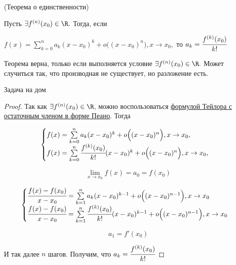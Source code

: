 \begin{theorem}
	\hypertarget{thrm7.3}{(Теорема о единственности)} Пусть $\exists f^{(n)}(x_{0}) \in \R.$ Тогда, если 
	
	$f(x) = \sum\limits_{k =0}^{n} a_{k}(x-x_{0})^{k} + o\Big((x-x_{0})^{n}\Big), x \to x_{0},$ то $a_{k} = \cfrac{f^{(k)}(x_{0})}{k!}$
\end{theorem}
\begin{note}
	Теорема верна, только если выполняется условие $\exists f^{(n)}(x_{0}) \in \R.$ Может случиться так, что производная не существует, но разложение есть.
\begin{example}
	Задача на дом
\end{example} 
\end{note}
\begin{proof}
	Так как $\exists f^{(n)}(x_{0}) \in \R$, можно воспользоваться \hyperlink{thrm7.1}{формулой Тейлора с остаточным членом в форме Пеано}. Тогда 
	
	$$\begin{cases}
		f(x) = \sum\limits_{k = 0}^{n} a_{k} (x-x_{0})^{k} +  o\Big((x-x_{0})^{n}\Big) , x \to x_{0}, \\
		f(x) = \sum\limits_{k = 0}^{n} \cfrac{f^{(k)}(x_{0})}{k!} (x-x_{0})^{k} +  o\Big((x-x_{0})^{n}\Big) , x \to x_{0},
	\end{cases}$$
	
	$$ \lim\limits_{x\to x_{0}} f(x) =  a_{0} = f(x_{0})$$
	
	$$
	\begin{cases}
		\cfrac{f(x)-f(x_{0})}{x-x_{0}} = \sum\limits_{k=1}^{n} a_{k} (x-x_{0})^{k-1} +o\Big((x-x_{0})^{n-1}\Big) , x \to x_{0} \\
		\cfrac{f(x)-f(x_{0})}{x-x_{0}} = \sum\limits_{k=1}^{n} \cfrac{f^{(k)}(x_{0})}{k!} (x-x_{0})^{k-1} +o\Big((x-x_{0})^{n-1}\Big) , x \to x_{0}
	\end{cases}
	 $$
	 
	 $$ a_{1} = f'(x_{0})$$
	 
	 И так далее $n$ шагов. Получим, что $a_{k} = \cfrac{f^{(k)}(x_{0})}{k!}$
\end{proof}

